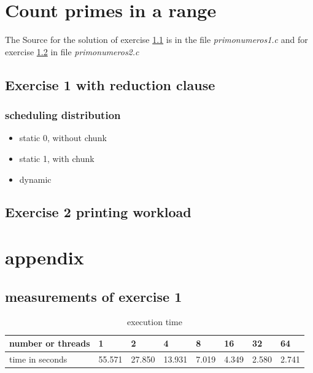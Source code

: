 \documentclass[11pt,a4paper]{article}
\begin{document}
\pagebreak

\section{Count primes in a range}

The Source for the solution of exercise \ref{ex21} is in the file
 \textit{primo\textunderscore numeros\textunderscore 1.c} and
 for exercise \ref{ex22} in file \textit{primo\textunderscore numeros\textunderscore 2.c}

\subsection{Exercise 1 with reduction clause}
\label{ex21}
\subsubsection{scheduling distribution}


\begin{itemize}
\item static 0, without chunk
\item static 1, with chunk
\item dynamic
\end{itemize}

\subsection{Exercise 2 printing workload}
\label{ex22}


\section{appendix}

\subsection{measurements of exercise 1}
\begin{table}[h]
\centering

\label{measuresEx1}
\begin{tabular}{@{}l||l|l|l|l|l|l|l|@{}}
number or threads & 1      & 2      & 4      & 8     & 16    & 32    & 64    \\
\hline	
time in seconds   & 55.571 & 27.850 & 13.931 & 7.019 & 4.349 & 2.580 & 2.741
\end{tabular}
\caption{execution time}
\end{table}






\end{document}
